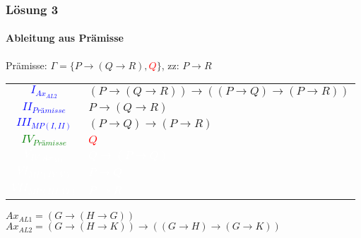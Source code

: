 \begin{frame}
	\frametitle{Lösung 3}
	\framesubtitle{Ableitung aus Prämisse}
	Prämisse: $\Gamma =\{P\rightarrow(Q\rightarrow R), $\textcolor{red}{$Q$}$\}$, zz: $P\rightarrow R$\\
	\begin{tabular}{cl}
		\textcolor{blue}{$I_{Ax_{AL2}}$}            & $(P\rightarrow(Q\rightarrow R))\rightarrow((P\rightarrow Q)\rightarrow(P\rightarrow R))$ \\
		\textcolor{blue}{$II_{\textit{Prämisse}}$}  & $P\rightarrow(Q\rightarrow R)$                                                           \\
		\textcolor{blue}{$III_{MP(I, II)}$}         & $(P\rightarrow Q)\rightarrow(P\rightarrow R)$                                            \\
		\textcolor{green}{$IV_{\textit{Prämisse}}$} & \textcolor{red}{$Q$}                                                                     \\
		\textcolor{white}{$V_{IV, Ax_{AL1}}$}       & \textcolor{white}{$Q\rightarrow(P\rightarrow Q)$}                                        \\
		\textcolor{white}{$VI_{MP(IV, V)}$}         & \textcolor{white}{$P\rightarrow Q$}                                                      \\
		\textcolor{white}{$VII_{MP(III, VI)}$}      & \textcolor{white}{$P\rightarrow R$}                                                      \\
	\end{tabular}
	$Ax_{AL1} = (G\rightarrow(H\rightarrow G))$\\
	$Ax_{AL2} = (G\rightarrow(H\rightarrow K))\rightarrow((G\rightarrow H)\rightarrow(G\rightarrow K))$\\
\end{frame}
